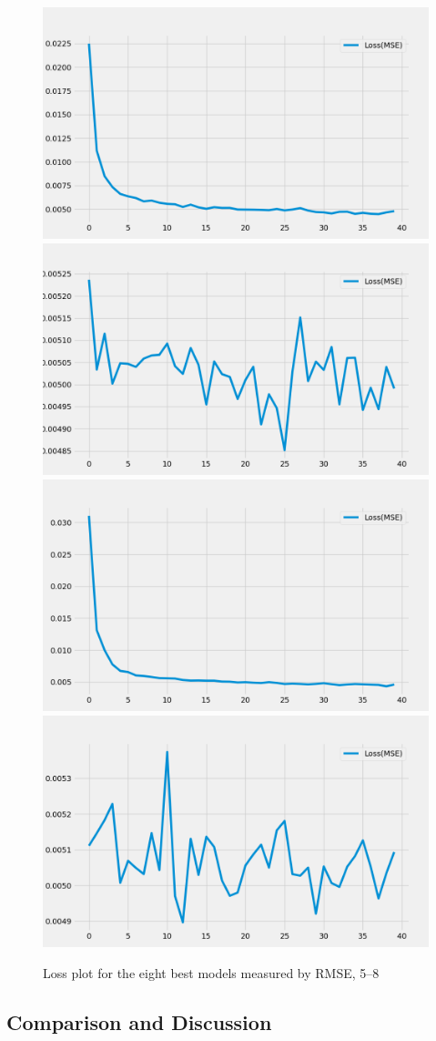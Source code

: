\begin{figure}
    \includegraphics[width=.48\textwidth]{../data/Figures/Neural networks/ForLoop_Tensor/plotLoss_202.png}\hfill
    \includegraphics[width=.48\textwidth]{../data/Figures/Neural networks/ForLoop_Tensor/plotLoss_124.png}\hfill
    \\[\smallskipamount]
    \includegraphics[width=.48\textwidth]{../data/Figures/Neural networks/ForLoop_Tensor/plotLoss_130.png}\hfill
    \includegraphics[width=.48\textwidth]{../data/Figures/Neural networks/ForLoop_Tensor/plotLoss_52.png}\caption{Loss plot for the eight best models measured by RMSE, 5--8}\label{fig:loss_58}
\end{figure}

\subsection{Comparison and Discussion}\label{sec:comparison}

